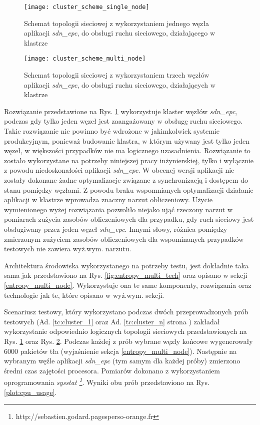 \begin{figure}[h]
\centering
\texttt{[image: cluster\_scheme\_single\_node]}
\caption{Schemat topologii sieciowej z wykorzystaniem jednego węzła aplikacji
   \textit{sdn\_epc}, do obsługi ruchu sieciowego, działającego w klastrze}
\label{fig:cluster_scheme_single_node}
\end{figure}
\newpage

\begin{figure}[h]
\centering
\texttt{[image: cluster\_scheme\_multi\_node]}
\caption{Schemat topologii sieciowej z wykorzystaniem trzech węzłów aplikacji
  \textit{sdn\_epc}, do obsługi ruchu sieciowego, działających w klastrze}
\label{fig:cluster_scheme_multi_node}
\end{figure}

Rozwiązanie przedstawione na Rys. \ref{fig:cluster_scheme_single_node}
wykorzystuje klaster węzłów \textit{sdn\_epc}, podczas gdy tylko jeden węzeł
jest zaangażowany w obsługę ruchu sieciowego. Takie rozwiązanie nie powinno być
wdrożone w jakimkolwiek systemie produkcyjnym, ponieważ budowanie klastra, w
którym używany jest tylko jeden węzeł, w większości przypadków nie ma logicznego
uzasadnienia. Rozwiązanie to zostało wykorzystane na potrzeby niniejszej pracy
inżynierskiej, tylko i wyłącznie z powodu niedoskonałości aplikacji
\textit{sdn\_epc}. W obecnej wersji aplikacji nie zostały dokonane żadne
optymalizacje związane z synchronizacją i dostępem do stanu pomiędzy węzłami. Z
powodu braku wspomnianych optymalizacji działanie aplikacji w klastrze wprowadza
znaczny narzut obliczeniowy. Użycie wymienionego wyżej rozwiązania pozwoliło
niejako ująć rzeczony narzut w pomiarach zużycia zasobów obliczeniowych dla
przypadku, gdy ruch sieciowy jest obsługiwany przez jeden węzeł
\textit{sdn\_epc}. Innymi słowy, różnica pomiędzy zmierzonym zużyciem zasobów
obliczeniowych dla wspominanych przypadków testowych nie zawiera wyż.wym.
narzutu. 

Architektura środowiska wykorzystanego na potrzeby testu, jest dokładnie taka
sama jak przedstawiono na Rys. \ref{fig:entropy_multi_tech} oraz opisano w
sekcji \ref{entropy_multi_node}. Wykorzystuje ona te same komponenty,
rozwiązania oraz technologie jak te, które opisano w wyż.wym. sekcji.

Scenariusz testowy, który wykorzystano podczas dwóch przeprowadzonych prób
testowych (Ad. \ref{tc:cluster_1} oraz Ad. \ref{tc:cluster_n} strona
\pageref{tc:cluster_1}) zakładał wykorzystanie odpowiednio logicznych topologii
sieciowych przedstawionych na Rys. \ref{fig:cluster_scheme_single_node} oraz
Rys. \ref{fig:cluster_scheme_multi_node}. Podczas każdej z prób wybrane węzły
końcowe wygenerowały 6000 pakietów tła (wyjaśnienie sekcja
\ref{entropy_multi_node}). Następnie na wybranym węźle aplikacji
\textit{sdn\_epc} (tym samym dla każdej próby) zmierzono średni czas zajętości 
procesora. Pomiarów dokonano z wykorzystaniem oprogramowania \textit{sysstat
  \footnote{http://sebastien.godard.pagesperso-orange.fr}}. Wyniki obu prób
przedstawiono na Rys. \ref{plot:cpu_usage}.

